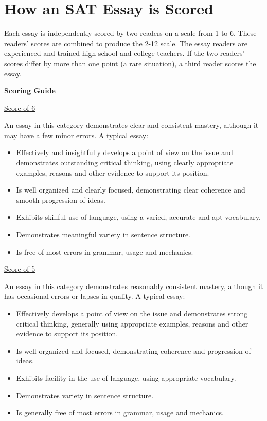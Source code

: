 \vfill
\newpage

\section{How an SAT Essay is Scored}
Each essay is independently scored by two readers on a scale from 1 to 6. These readers' scores are combined to produce the 2-12 scale. The essay readers are experienced and trained high school and college teachers.
If the two readers' scores differ by more than one point (a rare situation), a third reader scores the essay.

\begin{center}
\textbf{Scoring Guide}
\end{center}

\bigskip
\underline{Score of 6}

An essay in this category demonstrates clear and consistent mastery, although it may have a few minor errors. A typical essay:

\begin{itemize}
\item{Effectively and insightfully develops a point of view on the issue and demonstrates outstanding critical thinking, using clearly appropriate examples, reasons and other evidence to support its position.}
\item{Is well organized and clearly focused, demonstrating clear coherence and smooth progression of ideas.}
\item{Exhibits skillful use of language, using a varied, accurate and apt vocabulary.}
\item{Demonstrates meaningful variety in sentence structure.}
\item{Is free of most errors in grammar, usage and mechanics.}
\end{itemize}

\vfill
\underline{Score of 5}

An essay in this category demonstrates reasonably consistent mastery, although it has occasional errors or lapses in quality. A typical essay:

\begin{itemize}
\item{Effectively develops a point of view on the issue and demonstrates strong critical thinking, generally using appropriate examples, reasons and other evidence to support its position.}
\item{Is well organized and focused, demonstrating coherence and progression of ideas.}
\item{Exhibits facility in the use of language, using appropriate vocabulary.}
\item{Demonstrates variety in sentence structure.}
\item{Is generally free of most errors in grammar, usage and mechanics.}
\end{itemize}

